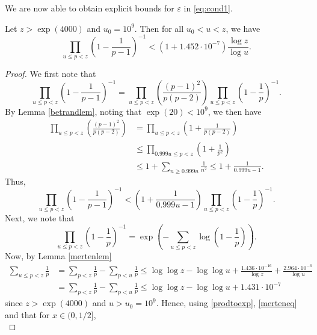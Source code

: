 \documentclass[12pt]{amsart}
\begin{document}
We are now able to obtain explicit bounds for $\varepsilon$ in \eqref{eq:cond1}.
\begin{lemma} \label{lem: prod-u>u_0} Let $z>\exp(4000)$ and $u_0=10^9$. Then for all $u_0<u<z$, we have
    \begin{equation}\label{epsmainbound}
        \prod_{u\le p<z}\left(1-\frac{1}{p-1}\right)^{-1}<\left(1+1.452\cdot 10^{-7}\right)\frac{\log z}{\log u}.
    \end{equation}
\end{lemma}
\begin{proof}
    We first note that
    \begin{equation*}
        \prod_{u\le p<z}\left(1-\frac{1}{p-1}\right)^{-1}=\prod_{u\le p<z}\left(\frac{(p-1)^2}{p(p-2)}\right)\prod_{u\le p<z}\left(1-\frac{1}{p}\right)^{-1}.
    \end{equation*}
    By Lemma \ref{betrandlem}, noting that $\exp(20)<10^9$, we then have
    \begin{align*}
        \prod_{u\le p<z}\left(\frac{(p-1)^2}{p(p-2)}\right)&=\prod_{u\le p<z}\left(1+\frac{1}{p(p-2)}\right)\\
        &\le\prod_{0.999u\le p<z}\left(1+\frac{1}{p^2}\right)\\
        &\le 1+\sum_{n\ge 0.999u}\frac{1}{n^2}\le 1+\frac{1}{0.999u-1}.
    \end{align*}
    Thus,
    \begin{equation}\label{prodeq1}
        \prod_{u\le p<z}\left(1-\frac{1}{p-1}\right)^{-1}<\left(1+\frac{1}{0.999u-1}\right)\prod_{u\le p<z}\left(1-\frac{1}{p}\right)^{-1}.
    \end{equation}
    Next, we note that
    \begin{equation}\label{prodtoexp}
        \prod_{u\le p<z}\left(1-\frac{1}{p}\right)^{-1}=\exp\left(-\sum_{u\le p<z}\log\left(1-\frac{1}{p}\right)\right).
    \end{equation}
    Now, by Lemma \ref{mertenlem}
    \begin{align}\label{merteneq}
        \sum_{u\le p< z}\frac{1}{p}&=\sum_{p<z}\frac{1}{p}-\sum_{p<u}\frac{1}{p}\le\log\log z-\log\log u+\frac{1.436\cdot 10^{-16}}{\log z}+\frac{2.964\cdot 10^{-6}}{\log u}\\
        &=\sum_{p<z}\frac{1}{p}-\sum_{p<u}\frac{1}{p}\le\log\log z-\log\log u+1.431\cdot 10^{-7}
    \end{align}
    since $z>\exp(4000)$ and $u>u_0=10^9$. Hence, using \eqref{prodtoexp}, \eqref{merteneq} and that for $x\in(0,1/2]$,
    \begin{equation*}

\end{equation*}
\end{proof}
\end{document}
